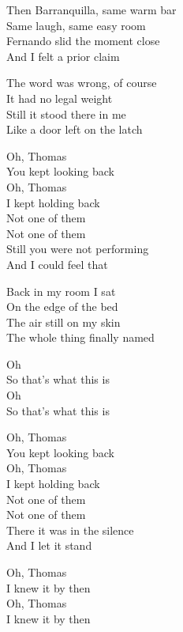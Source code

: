 \begin{lyrics}
Then Barranquilla, same warm bar\\
Same laugh, same easy room\\
Fernando slid the moment close\\
And I felt a prior claim

The word was wrong, of course\\
It had no legal weight\\
Still it stood there in me\\
Like a door left on the latch

Oh, Thomas\\
You kept looking back\\
Oh, Thomas\\
I kept holding back\\
Not one of them\\
Not one of them\\
Still you were not performing\\
And I could feel that

Back in my room I sat\\
On the edge of the bed\\
The air still on my skin\\
The whole thing finally named

Oh\\
So that’s what this is\\
Oh\\
So that’s what this is

Oh, Thomas\\
You kept looking back\\
Oh, Thomas\\
I kept holding back\\
Not one of them\\
Not one of them\\
There it was in the silence\\
And I let it stand

Oh, Thomas\\
I knew it by then\\
Oh, Thomas\\
I knew it by then
\end{lyrics}

